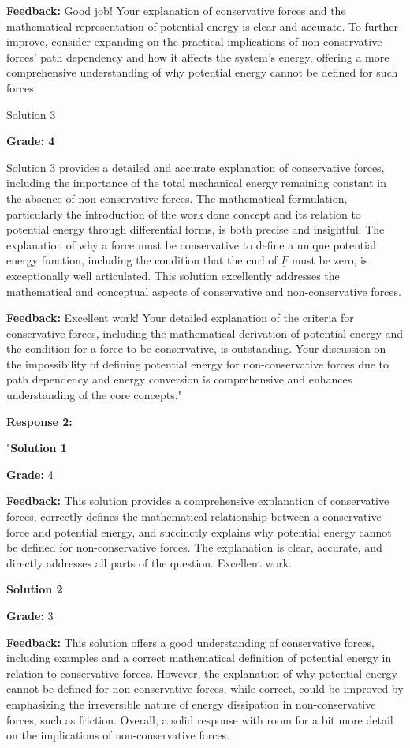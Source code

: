 \documentclass[a4paper,11pt]{article}
\begin{document}
\textbf{Feedback:} Good job! Your explanation of conservative forces and the mathematical representation of potential energy is clear and accurate. To further improve, consider expanding on the practical implications of non-conservative forces' path dependency and how it affects the system's energy, offering a more comprehensive understanding of why potential energy cannot be defined for such forces.

Solution 3

\textbf{Grade: 4}

Solution 3 provides a detailed and accurate explanation of conservative forces, including the importance of the total mechanical energy remaining constant in the absence of non-conservative forces. The mathematical formulation, particularly the introduction of the work done concept and its relation to potential energy through differential forms, is both precise and insightful. The explanation of why a force must be conservative to define a unique potential energy function, including the condition that the curl of \( \underline{F} \) must be zero, is exceptionally well articulated. This solution excellently addresses the mathematical and conceptual aspects of conservative and non-conservative forces.

\textbf{Feedback:} Excellent work! Your detailed explanation of the criteria for conservative forces, including the mathematical derivation of potential energy and the condition for a force to be conservative, is outstanding. Your discussion on the impossibility of defining potential energy for non-conservative forces due to path dependency and energy conversion is comprehensive and enhances understanding of the core concepts."

\textbf{Response 2:}

"\textbf{Solution 1}

\textbf{Grade:} 4

\textbf{Feedback:} This solution provides a comprehensive explanation of conservative forces, correctly defines the mathematical relationship between a conservative force and potential energy, and succinctly explains why potential energy cannot be defined for non-conservative forces. The explanation is clear, accurate, and directly addresses all parts of the question. Excellent work.

\textbf{Solution 2}

\textbf{Grade:} 3

\textbf{Feedback:} This solution offers a good understanding of conservative forces, including examples and a correct mathematical definition of potential energy in relation to conservative forces. However, the explanation of why potential energy cannot be defined for non-conservative forces, while correct, could be improved by emphasizing the irreversible nature of energy dissipation in non-conservative forces, such as friction. Overall, a solid response with room for a bit more detail on the implications of non-conservative forces.
\end{document}
